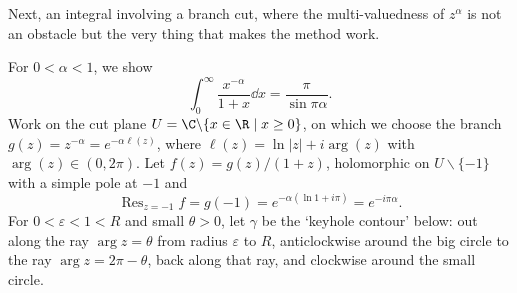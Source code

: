 Next, an integral involving a branch cut, where the multi-valuedness of $z^{\alpha}$ is not an obstacle but the very thing that makes the method work.

\begin{example}
    For $0 < \alpha < 1$, we show
    $$
    \int_0^{\infty} \frac{x^{-\alpha}}{1 + x} \dd x = \frac{\pi}{\sin \pi \alpha}.
    $$
    Work on the cut plane $U = \C \backslash \{x \in \R \mid x \geq 0\}$, on which we choose the branch $g(z) = z^{-\alpha} = e^{-\alpha \ell(z)}$, where $\ell(z) = \ln|z| + i \arg(z)$ with $\arg(z) \in (0, 2\pi)$. Let $f(z) = g(z)/(1 + z)$, holomorphic on $U \backslash \{-1\}$ with a simple pole at $-1$ and
    $$
    \operatorname{Res}_{z = -1} f = g(-1) = e^{-\alpha(\ln 1 + i \pi)} = e^{-i \pi \alpha}.
    $$
    For $0 < \varepsilon < 1 < R$ and small $\theta > 0$, let $\gamma$ be the `keyhole contour' below: out along the ray $\arg z = \theta$ from radius $\varepsilon$ to $R$, anticlockwise around the big circle to the ray $\arg z = 2\pi - \theta$, back along that ray, and clockwise around the small circle.

    \begin{center}
    \end{center}


\end{example}
